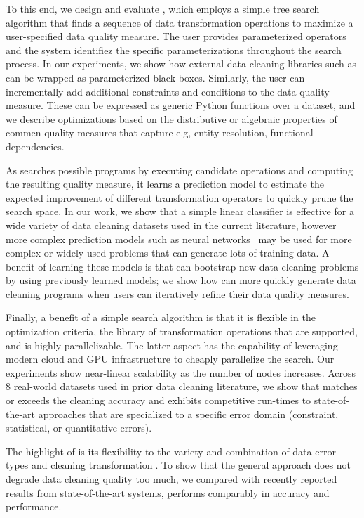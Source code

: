 To this end, we design and evaluate \sys, which employs a simple tree search algorithm that finds a sequence of data transformation operations to maximize a user-specified data quality measure.   The user provides parameterized operators and the system identifiez the specific parameterizations throughout the search process.  In our experiments, we show how external data cleaning libraries such as  can be wrapped as parameterized black-boxes.  Similarly, the user can incrementally add additional constraints and conditions to the data quality measure.  These can be expressed as generic Python functions over a dataset, and we describe optimizations based on the distributive or algebraic properties of commen quality measures that capture e.g, entity resolution, functional dependencies.

As \sys searches possible programs by executing candidate operations and computing the resulting quality measure, it learns a prediction model to estimate the expected improvement of different transformation operators to quickly prune the search space.  In our work, we show that a simple linear classifier is effective for a wide variety of data cleaning datasets used in the current literature, however more complex prediction models such as neural networks~\cite{} may be used for more complex or widely used problems that can generate lots of training data.   A benefit of learning these models is that \sys can bootstrap new data cleaning problems by using previously learned models; we show how \sys can more quickly generate data cleaning programs when users can iteratively refine their data quality measures.

Finally, a benefit of a simple search algorithm is that it is flexible in the optimization criteria, the library of transformation operations that are supported, and is highly parallelizable.  The latter aspect has the capability of leveraging modern cloud and GPU infrastructure to cheaply parallelize the search.  Our experiments show near-linear scalability as the number of nodes increases.
Across 8 real-world datasets used in prior data cleaning literature, we show that \sys matches or exceeds the cleaning accuracy and exhibits competitive run-times to state-of-the-art approaches that are specialized to a specific error domain (constraint, statistical, or quantitative errors).  

The highlight of \sys is its flexibility to the variety and combination of data error types and cleaning transformation.   To show that the general approach does not degrade data cleaning quality too much, we compared with recently reported results from state-of-the-art systems, \sys performs comparably in accuracy and performance.



